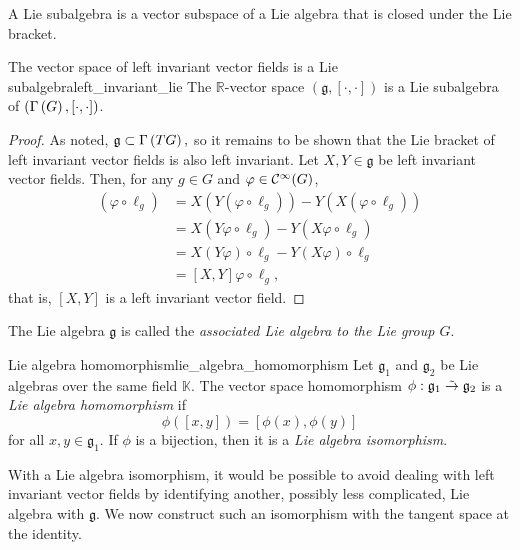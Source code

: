 A Lie subalgebra is a vector subspace of a Lie algebra that is closed under the Lie bracket.
\begin{theorem}{The vector space of left invariant vector fields is a Lie subalgebra}{left_invariant_lie}
    The \(\mathbb{R}\)-vector space \((\mathfrak{g}, [\cdot, \cdot])\) is a Lie subalgebra of \((\Gamma\left(G\right), [\cdot, \cdot])\).
\end{theorem}
\begin{proof}
    As noted, \(\mathfrak{g} \subset \Gamma\left(TG\right),\) so it remains to be shown that the Lie bracket of left invariant vector fields is also left invariant. Let \(X, Y \in \mathfrak{g}\) be left invariant vector fields. Then, for any \(g \in G\) and \(\varphi \in \mathcal{C}^\infty(G)\),
    \begin{align*}
        [X,Y](\varphi \circ \ell_g) &= X(Y(\varphi \circ \ell_g)) - Y(X(\varphi \circ \ell_g))\\
                                       &= X(Y\varphi \circ \ell_g) - Y(X\varphi \circ \ell_g)\\
                                       &= X(Y\varphi)\circ \ell_g - Y(X\varphi) \circ \ell_g\\
                                       &= [X,Y]\varphi \circ \ell_g,
    \end{align*}
    that is, \([X,Y]\) is a left invariant vector field.
\end{proof}
\begin{remark}
    The Lie algebra \(\mathfrak{g}\) is called the \emph{associated Lie algebra to the Lie group \(G\)}.
\end{remark}

\begin{definition}{Lie algebra homomorphism}{lie_algebra_homomorphism}
    Let \(\mathfrak{g}_1\) and \(\mathfrak{g}_2\) be Lie algebras over the same field \(\mathbb{K}.\) The vector space homomorphism \(\phi : \mathfrak{g}_1 \mathrel{\tilde{\to}} \mathfrak{g}_2\) is a \emph{Lie algebra homomorphism} if
    \begin{equation*}
        \phi([x,y]) = [\phi(x), \phi(y)]
    \end{equation*}
    for all \(x,y \in \mathfrak{g}_1.\) If \(\phi\) is a bijection, then it is a \emph{Lie algebra isomorphism}.
\end{definition}

With a Lie algebra isomorphism, it would be possible to avoid dealing with left invariant vector fields by identifying another, possibly less complicated, Lie algebra with \(\mathfrak{g}.\) We now construct such an isomorphism with the tangent space at the identity.


